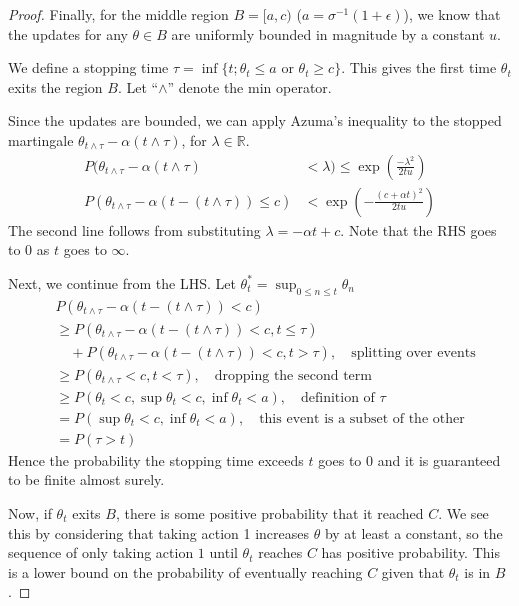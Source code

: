 \begin{proof}
Finally, for the middle region $B = [a, c)$ ($a = \sigma^{-1} (1 + \epsilon)$), we know that the updates for any $\theta \in B$ are uniformly bounded in magnitude by a constant $u$. 

We define a stopping time $\tau = \inf \{t ; \theta_t \le a \text{ or } \theta_t \ge c \}$. This gives the first time $\theta_t$ exits the region $B$. Let ``$\land$'' denote the min operator.

Since the updates are bounded, we can apply Azuma's inequality to the stopped martingale $\theta_{t \land \tau} - \alpha(t \land \tau) $, for $\lambda \in \mathbb{R}$.
\begin{align*}
    P( \theta_{t \land \tau} - \alpha (t \land \tau) &< \lambda) \le \exp \left( \frac{-\lambda^2}{2 t u} \right) \\
    P(\theta_{t \land \tau} - \alpha (t - (t \land \tau)) \le c) &< \exp \left( -\frac{(c+ \alpha t)^2}{2 t u} \right) 
\end{align*}
The second line follows from substituting $\lambda = -\alpha t + c$. Note that the RHS goes to 0 as $t$ goes to $\infty$.

Next, we continue from the LHS. Let $\theta^*_t = \sup_{0 \le n \le t} \theta_n$
\begin{align*}
 &P(\theta_{t \land \tau} - \alpha (t - (t \land \tau)) < c) \\ 
 &\ge P(\theta_{t \land \tau} - \alpha (t - (t \land \tau)) < c, t \le \tau ) \\ 
 &\quad + P(\theta_{t \land \tau} - \alpha (t - (t \land \tau)) < c, t > \tau), \quad \text{splitting over events} \\ 
 &\ge P(\theta_{t \land \tau} < c, t< \tau), \quad \text{dropping the second term} \\
 &\ge P(\theta_{t} < c, \sup \theta_t < c, \inf \theta_t < a), \quad \text{definition of $\tau$} \\
 &= P(\sup \theta_t < c, \inf \theta_t < a), \quad \text{this event is a subset of the other} \\
 &=  P(\tau > t)
\end{align*}
Hence the probability the stopping time exceeds $t$ goes to $0$ and it is guaranteed to be finite almost surely.

Now, if $\theta_t$ exits $B$, there is some positive probability that it reached $C$. We see this by considering that taking action 1 increases $\theta$ by at least a constant, so the sequence of only taking action $1$ until $\theta_t$ reaches $C$ has positive probability. This is a lower bound on the probability of eventually reaching $C$ given that $\theta_t$ is in $B$.


\end{proof}

